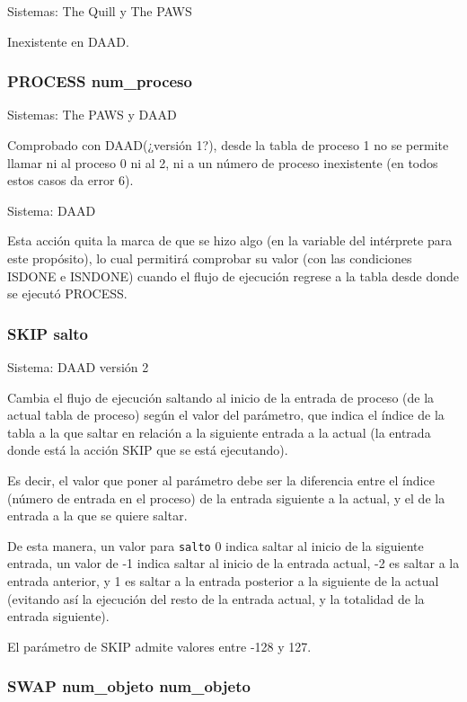\documentclass[11pt, a5paper]{article}
\newcommand{\quill}{\textsf{The Quill}\xspace}
\newcommand{\paw}{\textsf{The PAWS}\xspace}
\newcommand{\daad}{\textsf{DAAD}\xspace}
\newcommand{\sistema}[1]{\noindent Sistema: #1 \nopagebreak}
\newcommand{\sistemas}[1]{\noindent Sistemas: #1 \nopagebreak}
\begin{document}
\sistemas{\quill y \paw}

Inexistente en \daad.

\subsubsection{PROCESS num\_proceso}

\sistemas{\paw y \daad}

Comprobado con \daad (¿versión 1?), desde la tabla de proceso 1 no se permite llamar ni al proceso 0 ni al 2, ni a un número de proceso inexistente (en todos estos casos da error 6).

\sistema{\daad}

Esta acción quita la marca de que se hizo algo (en la variable del intérprete para este propósito), lo cual permitirá comprobar su valor (con las condiciones ISDONE e ISNDONE) cuando el flujo de ejecución regrese a la tabla desde donde se ejecutó PROCESS.

\subsubsection{SKIP salto}

\sistema{\daad versión 2}

Cambia el flujo de ejecución saltando al inicio de la entrada de proceso (de la actual tabla de proceso) según el valor del parámetro, que indica el índice de la tabla a la que saltar en relación a la siguiente entrada a la actual (la entrada donde está la acción SKIP que se está ejecutando).

Es decir, el valor que poner al parámetro debe ser la diferencia entre el índice (número de entrada en el proceso) de la entrada siguiente a la actual, y el de la entrada a la que se quiere saltar.

De esta manera, un valor para \texttt{salto} 0 indica saltar al inicio de la siguiente entrada, un valor de -1 indica saltar al inicio de la entrada actual, -2 es saltar a la entrada anterior, y 1 es saltar a la entrada posterior a la siguiente de la actual (evitando así la ejecución del resto de la entrada actual, y la totalidad de la entrada siguiente).

El parámetro de SKIP admite valores entre -128 y 127.

\subsubsection{SWAP num\_objeto num\_objeto}
\end{document}
